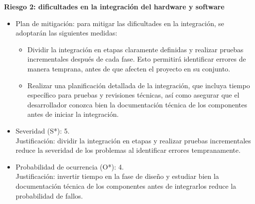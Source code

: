 \documentclass[
11pt, %
]{charter}
\begin{document}
\textbf{Riesgo 2: dificultades en la integración del hardware y software}
\begin{itemize}
	\item Plan de mitigación: para mitigar las dificultades en la integración, se adoptarán las siguientes medidas:
	\begin{itemize}
	    \item Dividir la integración en etapas claramente definidas y realizar pruebas incrementales después de cada fase. Esto permitirá identificar errores de manera temprana, antes de que afecten el proyecto en su conjunto.
    	\item Realizar una planificación detallada de la integración, que incluya tiempo específico para pruebas y revisiones técnicas, así como asegurar que el desarrollador conozca bien la documentación técnica de los componentes antes de iniciar la integración.
	\end{itemize}
    \item Severidad (S*): 5.\\
    Justificación: dividir la integración en etapas y realizar pruebas incrementales reduce la severidad de los problemas al identificar errores tempranamente.
    \item Probabilidad de ocurrencia (O*): 4.\\
    Justificación: invertir tiempo en la fase de diseño y estudiar bien la documentación técnica de los componentes antes de integrarlos reduce la probabilidad de fallos.
\end{itemize}
\end{document}

